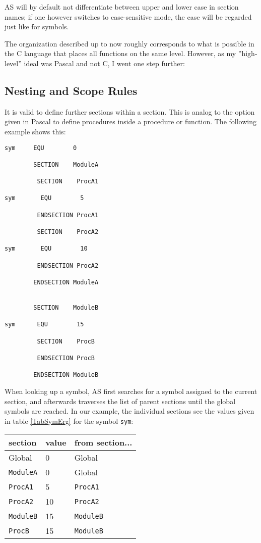 \documentclass[12pt,twoside]{report}
\newcommand{\tty}[1]{{\tt #1}}
\begin{document}
AS will by default not differentiate between upper and lower case in
section names; if one however switches to case-sensitive mode, the
case will be regarded just like for symbols.

The organization described up to now roughly corresponds to what is
possible in the C language that places all functions on the same
level.  However, as my ''high-level'' ideal was Pascal and not C, I
went one step further:


\subsection{Nesting and Scope Rules}

It is valid to define further sections within a section.  This is
analog to the option given in Pascal to define procedures inside a
procedure or function.  The following example shows this:
\begin{verbatim}
sym     EQU        0

        SECTION    ModuleA

         SECTION    ProcA1

sym       EQU        5

         ENDSECTION ProcA1

         SECTION    ProcA2

sym       EQU        10

         ENDSECTION ProcA2

        ENDSECTION ModuleA


        SECTION    ModuleB

sym      EQU        15

         SECTION    ProcB

         ENDSECTION ProcB

        ENDSECTION ModuleB
\end{verbatim}
When looking up a symbol, AS first searches for a symbol assigned to
the current section, and afterwards traverses the list of parent
sections until the global symbols are reached.  In our example, the
individual sections see the values given in table \ref{TabSymErg} for
the symbol \tty{sym}:
\begin{table*}[htb]
\begin{center}\begin{tabular}{|l|l|l|}
\hline
section        &   value &   from section... \\
\hline
\hline
Global         &     0   &   Global \\
\hline
\tty{ModuleA}  &     0   &   Global \\
\hline
\tty{ProcA1}   &     5   &   \tty{ProcA1} \\
\hline
\tty{ProcA2}   &    10   &   \tty{ProcA2} \\
\hline
\tty{ModuleB}  &    15   &   \tty{ModuleB} \\
\hline
\tty{ProcB}    &    15   &   \tty{ModuleB} \\
\hline
\end{tabular}\end{center}
\caption{Valid values for the Individual Sections\label{TabSymErg}}
\end{table*}
\end{document}
